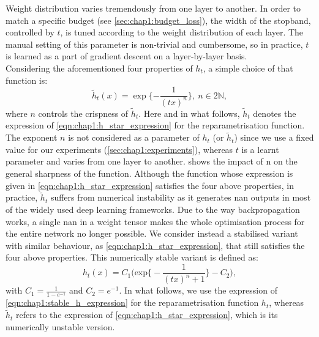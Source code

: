 Weight distribution varies tremendously from one layer to another. In order to
match a specific budget (see \cref{sec:chap1:budget_loss}), the width of the
stopband, controlled by $t$, is tuned according to the weight distribution of
each layer. The manual setting of this parameter is non-trivial and cumbersome,
so in practice, $t$ is learned as a part of gradient descent on a layer-by-layer
basis.\\

Considering the aforementioned four properties of $h_t$, a simple choice of that
function is:
\begin{equation}
  \label{eqn:chap1:h_star_expression}
  \tilde{h}_t(x) = \exp\bigg\{{-\displaystyle\frac{1}{(tx)^n}}\bigg\}, ~ n\in 2\mathds{N},
\end{equation}
\noindent where $n$ controls the crispness of $\tilde{h}_t$. Here and in what
follows, $\tilde{h}_t$ denotes the expression of
\cref{eqn:chap1:h_star_expression} for the reparametrisation function. The
exponent $n$ is not considered as a parameter of $h_t$ (or $\tilde{h}_t$) since
we use a fixed value for our experiments (\cref{sec:chap1:experiments}), whereas
$t$ is a learnt parameter and varies from one layer to another.
 shows the impact of n on the general
sharpness of the function. Although the function whose expression is given in
\cref{eqn:chap1:h_star_expression} satisfies the four above properties, in
practice, $\tilde{h}_t$ suffers from numerical instability as it generates
\ac{nan} outputs in most of the widely used deep learning frameworks. Due to the
way backpropagation works, a single \ac{nan} in a weight tensor makes the whole
optimisation process for the entire network no longer possible. We consider
instead a stabilised variant with similar behaviour, as
\cref{eqn:chap1:h_star_expression},  that still satisfies the four above
properties. This numerically stable variant is defined as:
\begin{equation}
  \label{eqn:chap1:stable_h_expression}
  h_t(x) = C_1 \biggl( \text{exp} \bigg\{-\displaystyle\frac{1}{(tx)^n +1}\bigg\} - C_2 \biggr),
\end{equation}
\noindent with $C_1=\frac{1}{1-e^{-1}}$ and $C_2 = e^{-1}$. In what follows, we
use the expression of \cref{eqn:chap1:stable_h_expression} for the
reparametrisation function $h_t$, whereas $\tilde{h}_t$ refers to the expression
of \cref{eqn:chap1:h_star_expression}, which is its numerically unstable
version.\\

